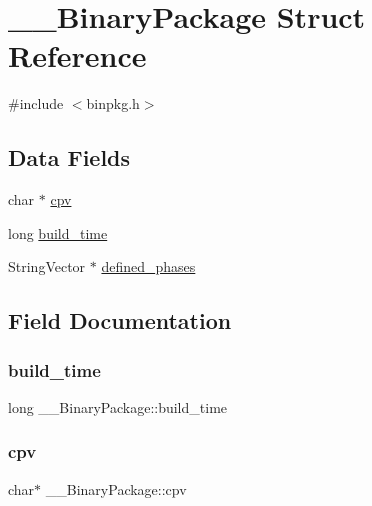 \hypertarget{struct_____binary_package}{}\section{\+\_\+\+\_\+\+Binary\+Package Struct Reference}
\label{struct_____binary_package}


{\ttfamily \#include $<$binpkg.\+h$>$}

\subsection*{Data Fields}
\begin{DoxyCompactItemize}
\item 
char $\ast$ \mbox{\hyperlink{struct_____binary_package_aef94b384f107b8a5203b6be4f90e230a}{cpv}}
\item 
long \mbox{\hyperlink{struct_____binary_package_a7ec49feee8f32060b33a31a9a575bac6}{build\+\_\+time}}
\item 
String\+Vector $\ast$ \mbox{\hyperlink{struct_____binary_package_a11c329473ddc741710911d6444115c8c}{defined\+\_\+phases}}
\end{DoxyCompactItemize}


\subsection{Field Documentation}
\mbox{\label{struct_____binary_package_a7ec49feee8f32060b33a31a9a575bac6}} 
\subsubsection{\texorpdfstring{build\+\_\+time}{build\_time}}
{\footnotesize\ttfamily long \+\_\+\+\_\+\+Binary\+Package\+::build\+\_\+time}

\mbox{\label{struct_____binary_package_aef94b384f107b8a5203b6be4f90e230a}} 
\subsubsection{\texorpdfstring{cpv}{cpv}}
{\footnotesize\ttfamily char$\ast$ \+\_\+\+\_\+\+Binary\+Package\+::cpv}


